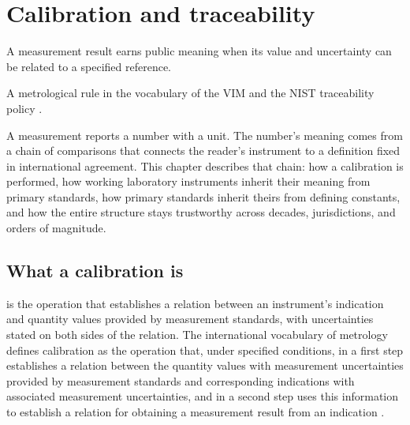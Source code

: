\chapter{Calibration and traceability}
\label{vol01:ch03}

\epigraph{A measurement result earns public meaning when its value
and uncertainty can be related to a specified reference.}{A
metrological rule in the vocabulary of the VIM
\cite{std:jcgm-vim} and the NIST traceability policy
\cite{std:nist-traceability}.}


\noindent
A measurement reports a number with a unit. The number's meaning
comes from a chain of comparisons that connects the reader's
instrument to a definition fixed in international agreement. This
chapter describes that chain: how a calibration is performed, how
working laboratory instruments inherit their meaning from primary
standards, how primary standards inherit theirs from defining
constants, and how the entire structure stays trustworthy across
decades, jurisdictions, and orders of magnitude.

\section{What a calibration is}

 is the operation that establishes a relation
between an instrument's indication and quantity values provided by
measurement standards, with uncertainties stated on both sides of
the relation. The international vocabulary of metrology defines
calibration as the operation that, under specified conditions, in a
first step establishes a relation between the quantity values with
measurement uncertainties provided by measurement standards and
corresponding indications with associated measurement uncertainties,
and in a second step uses this information to establish a relation
for obtaining a measurement result from an indication
\cite{std:jcgm-vim}.

